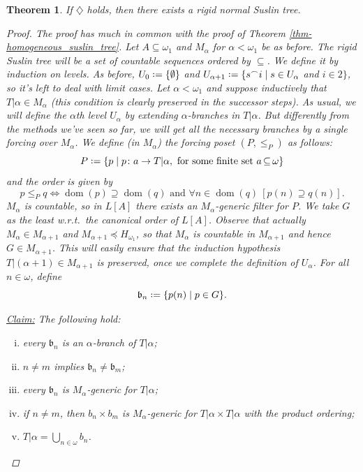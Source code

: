 \documentclass[11pt,a4paper]{report}
\newtheorem{theorem}{Theorem}[chapter] %
\theoremstyle{definition}
\theoremstyle{num.custom-title}
\theoremstyle{custom-title}
\newenvironment{claim}[1]{\par\noindent\underline{Claim#1:}\space}{} %
\DeclareMathOperator{\dom}{dom}
\DeclareMathOperator{\sse}{\subseteq}
\newcommand{\conc}{^\frown}
\newcommand*{\defeq}{\mathrel{\rlap{%
                     \raisebox{0.3ex}{$\cdot$}}%
                     \raisebox{-0.3ex}{$\cdot$}}%
                     =}
\begin{document}
\begin{theorem}
If $\diamondsuit$ holds, then there exists a rigid normal Suslin tree.
\begin{proof}
\renewcommand{\b}{\mathfrak{b}}
The proof has much in common with the proof of Theorem \ref{thm-homogeneous_suslin_tree}. Let $A \sse \omega_1$ and $M_\alpha$ for $\alpha < 	\omega_1$ be as before. The rigid Suslin tree will be a set of countable sequences ordered by $\sse$. We define it by induction on levels. As before, $U_0 \defeq \{\emptyset\}$ and $U_{\alpha+1} \defeq \{s \conc i \mid s \in U_\alpha$ and $i \in 2\}$, so it's left to deal with limit cases. Let $\alpha < \omega_1$ and suppose inductively that $T|\alpha \in M_\alpha$ (this condition is clearly preserved in the successor steps). As usual, we will define the $\alpha$th level $U_\alpha$ by extending $\alpha$-branches in $T|\alpha$. But differently from the methods we've seen so far, we will get \emph{all} the necessary branches by a single forcing over $M_\alpha$. We define (in $M_\alpha$) the forcing poset $(P,\leq_P)$ as follows:
\[
P \defeq \{ p \mid p \colon a \to T|\alpha, \text{ for some finite set $a \sse \omega$} \}
\]
and the order is given by
\[
p \leq_P q \Longleftrightarrow \dom(p) \supseteq \dom(q) \text{ and } \forall n \in \dom(q) \ [p(n) \supseteq q(n)].
\]
$M_\alpha$ is countable, so in $L[A]$ there exists an $M_\alpha$-generic filter for $P$. We take $G$ as the least w.r.t.\ the canonical order of $L[A]$. Observe that actually $M_\alpha \in M_{\alpha+1}$ and $M_{\alpha+1} \preceq H_{\omega_1}$, so that $M_\alpha$ is countable in $M_{\alpha+1}$ and hence $G \in M_{\alpha+1}$. This will easily ensure that the induction hypothesis $T|(\alpha+1) \in M_{\alpha+1}$ is preserved, once we complete the definition of $U_\alpha$. For all $n \in \omega$, define
\[
\b_n \defeq \{p(n) \mid p \in G\}.
\]
\begin{claim}{}
The following hold:
\begin{enumerate}[(i)]
\item every $\b_n$ is an $\alpha$-branch of $T|\alpha$;
\item $n \neq m$ implies $\b_n \neq \b_m$;
\item every $\b_n$ is $M_\alpha$-generic for $T|\alpha$;
\item if $n \neq m$, then $b_n \times b_m$ is $M_\alpha$-generic for $T|\alpha \times T|\alpha$ with the product ordering;
\item $T|\alpha = \bigcup_{n \in \omega} b_n$.
\end{enumerate}

\end{claim}
\end{proof}
\end{theorem}
\end{document}
